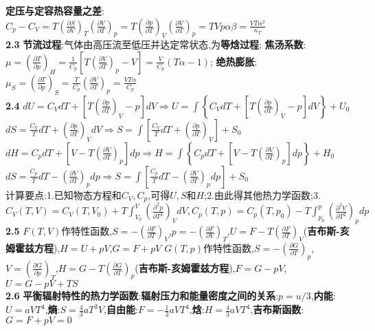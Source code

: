 \documentclass[10pt,a4paper]{article}
\begin{document}
\begin{multicols}{2}
\textbf{定压与定容热容量之差}:$C_p-C_V=T\left(\frac{\partial S}{\partial V}\right)_T\left(\frac{\partial V}{\partial T}\right)_p=T\left(\frac{\partial p}{\partial T}\right)_V\left(\frac{\partial V}{\partial T}\right)_p=TVp\alpha\beta=\frac{VT\alpha^2}{\kappa_T}$\\
\textbf{2.3}
\textbf{节流过程}:气体由高压流至低压并达定常状态,为\textbf{等焓过程};
\textbf{焦汤系数}:$\mu=\left(\frac{\partial T}{\partial p}\right)_H=\frac{1}{C_p}\left[T\left(\frac{\partial V}{\partial T}\right)_p-V\right]=\frac{V}{C_p}(T\alpha-1)$;
\textbf{绝热膨胀}:$\mu_S=\left(\frac{\partial T}{\partial p}\right)_S=\frac{T}{C_p}\left(\frac{\partial V}{\partial T}\right)_p=\frac{VT\alpha}{C_p}$\\
\textbf{2.4}
$dU=C_VdT+\left[T\left(\frac{\partial p}{\partial T}\right)_V-p\right]dV\Rightarrow U=\int\left\{C_VdT+\left[T\left(\frac{\partial p}{\partial T}\right)_V-p\right]dV\right\}+U_0$\\
$dS=\frac{C_V}{T}dT+\left(\frac{\partial p}{\partial T}\right)_VdV\Rightarrow S=\int\left[\frac{C_V}{T}dT+\left(\frac{\partial p}{\partial T}\right)_V\right]+S_0$\\
$dH=C_pdT+\left[V-T\left(\frac{\partial V}{\partial T}\right)_p\right]dp\Rightarrow H=\int\left\{C_pdT+\left[V-T\left(\frac{\partial V}{\partial T}\right)_p\right]dp\right\}+H_0$\\
$dS=\frac{C_p}{T}dT-\left(\frac{\partial V}{\partial T}\right)_pdp\Rightarrow S=\int\left[\frac{C_p}{T}dT-\left(\frac{\partial V}{\partial T}\right)_pdp\right]+S_0$\\
计算要点:1.已知物态方程和$C_V,C_p$,可得$U,S$和$H$;2.由此得其他热力学函数;3.$C_V(T,V)=C_V(T,V_0)+T\int_{V_0}^V\left(\frac{\partial^2p}{\partial T^2}\right)_VdV,C_p(T,p)=C_p(T,p_0)-T\int_{p_0}^p\left(\frac{\partial^2V}{\partial T^2}\right)_pdp$\\
\textbf{2.5}
$F(T,V)$作特性函数,$S=-\left(\frac{\partial F}{\partial T}\right)_V$,$p=-\left(\frac{\partial F}{\partial V}\right)_T$,$U=F-T\left(\frac{\partial F}{\partial T}\right)_V$(\textbf{吉布斯-亥姆霍兹方程}),$H=U+pV$,$G=F+pV$\quad\quad\quad\quad
$G(T,p)$作特性函数,$S=-\left(\frac{\partial G}{\partial T}\right)_p$,$V=\left(\frac{\partial G}{\partial p}\right)_T$,$H=G-T\left(\frac{\partial G}{\partial T}\right)_p$(\textbf{吉布斯-亥姆霍兹方程}),$F=G-pV$,$U=G-pV+TS$\\
\textbf{2.6}
\textbf{平衡辐射特性的热力学函数}:\textbf{辐射压力和能量密度之间的关系}:$p=u/3$,\textbf{内能}:$U=aVT^4$,\textbf{熵}:$S=\frac{4}{3}aT^3V$,\textbf{自由能}:$F=-\frac{1}{3}aVT^4$,\textbf{焓}:$H=\frac{4}{3}aVT^4$,\textbf{吉布斯函数}:$G=F+pV=0$\\

\end{multicols}
\end{document}
